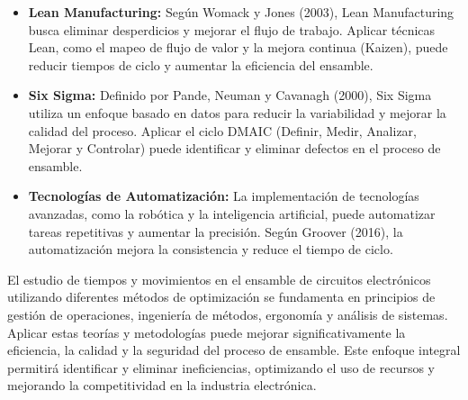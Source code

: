 \begin{itemize}
    \item\textbf{Lean Manufacturing:} Según Womack y Jones (2003), Lean Manufacturing busca eliminar desperdicios y mejorar el flujo de trabajo. Aplicar técnicas Lean, como el mapeo de flujo de valor y la mejora continua (Kaizen), puede reducir tiempos de ciclo y aumentar la eficiencia del ensamble.\cite{Lean}
    \item\textbf{Six Sigma:} Definido por Pande, Neuman y Cavanagh (2000), Six Sigma utiliza un enfoque basado en datos para reducir la variabilidad y mejorar la calidad del proceso. Aplicar el ciclo DMAIC (Definir, Medir, Analizar, Mejorar y Controlar) puede identificar y eliminar defectos en el proceso de ensamble. \cite{Sixsigma}
    \item\textbf{Tecnologías de Automatización:} La implementación de tecnologías avanzadas, como la robótica y la inteligencia artificial, puede automatizar tareas repetitivas y aumentar la precisión. Según Groover (2016), la automatización mejora la consistencia y reduce el tiempo de ciclo. \cite{Tecnologias}
\end{itemize}
El estudio de tiempos y movimientos en el ensamble de circuitos electrónicos utilizando diferentes métodos de optimización se fundamenta en principios de gestión de operaciones, ingeniería de métodos, ergonomía y análisis de sistemas. Aplicar estas teorías y metodologías puede mejorar significativamente la eficiencia, la calidad y la seguridad del proceso de ensamble. Este enfoque integral permitirá identificar y eliminar ineficiencias, optimizando el uso de recursos y mejorando la competitividad en la industria electrónica.
% 
% 
